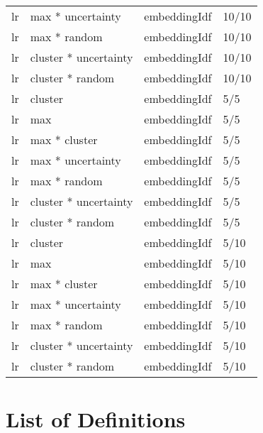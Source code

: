 \documentclass[12pt,twoside]{reedthesis}
\begin{document}
\begin{longtable}{llll}
\addlinespace
lr & max * uncertainty & embeddingIdf & 10/10\\
lr & max * random & embeddingIdf & 10/10\\
lr & cluster * uncertainty & embeddingIdf & 10/10\\
lr & cluster * random & embeddingIdf & 10/10\\
lr & cluster & embeddingIdf & 5/5\\
\addlinespace
lr & max & embeddingIdf & 5/5\\
lr & max * cluster & embeddingIdf & 5/5\\
lr & max * uncertainty & embeddingIdf & 5/5\\
lr & max * random & embeddingIdf & 5/5\\
lr & cluster * uncertainty & embeddingIdf & 5/5\\
\addlinespace
lr & cluster * random & embeddingIdf & 5/5\\
lr & cluster & embeddingIdf & 5/10\\
lr & max & embeddingIdf & 5/10\\
lr & max * cluster & embeddingIdf & 5/10\\
lr & max * uncertainty & embeddingIdf & 5/10\\
\addlinespace
lr & max * random & embeddingIdf & 5/10\\
lr & cluster * uncertainty & embeddingIdf & 5/10\\
lr & cluster * random & embeddingIdf & 5/10\\*
\end{longtable}
\hypertarget{list-of-definitions}{%
\chapter{List of Definitions}\label{list-of-definitions}}
\end{document}
